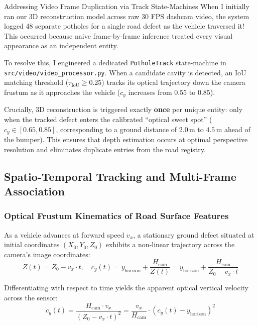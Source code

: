 \begin{designreflection}{Addressing Video Frame Duplication via Track State-Machines}
When I initially ran our 3D reconstruction model across raw 30 FPS dashcam video, the system logged 48 separate potholes for a single road defect as the vehicle traversed it! This occurred because naive frame-by-frame inference treated every visual appearance as an independent entity.

To resolve this, I engineered a dedicated \texttt{PotholeTrack} state-machine in \texttt{src/video/video\_processor.py}. When a candidate cavity is detected, an IoU matching threshold ($\tau_{\text{IoU}} \ge 0.25$) tracks its optical trajectory down the camera frustum as it approaches the vehicle ($c_y$ increases from $0.55$ to $0.85$). 

Crucially, 3D reconstruction is triggered exactly \textbf{once} per unique entity: only when the tracked defect enters the calibrated ``optical sweet spot'' ($c_y \in [0.65, 0.85]$, corresponding to a ground distance of $2.0\,\text{m}$ to $4.5\,\text{m}$ ahead of the bumper). This ensures that depth estimation occurs at optimal perspective resolution and eliminates duplicate entries from the road registry.
\end{designreflection}

\subsection{Spatio-Temporal Tracking and Multi-Frame Association}

\subsubsection{Optical Frustum Kinematics of Road Surface Features}
As a vehicle advances at forward speed $v_x$, a stationary ground defect situated at initial coordinates $(X_0, Y_0, Z_0)$ exhibits a non-linear trajectory across the camera's image coordinates:
\begin{equation}
    Z(t) = Z_0 - v_x \cdot t, \quad c_y(t) = y_{\text{horizon}} + \frac{H_{\text{cam}}}{Z(t)} = y_{\text{horizon}} + \frac{H_{\text{cam}}}{Z_0 - v_x \cdot t}
    \label{eq:optical_frustum_trajectory}
\end{equation}

Differentiating with respect to time yields the apparent optical vertical velocity across the sensor:
\begin{equation}
    \dot{c}_y(t) = \frac{H_{\text{cam}} \cdot v_x}{(Z_0 - v_x \cdot t)^2} = \frac{v_x}{H_{\text{cam}}} \cdot (c_y(t) - y_{\text{horizon}})^2
    \label{eq:apparent_velocity}
\end{equation}

